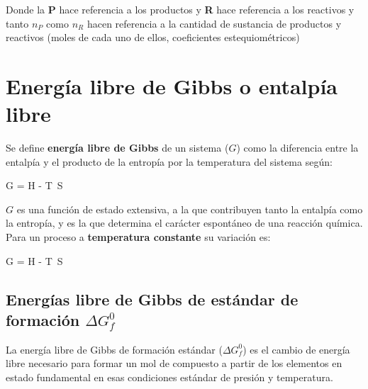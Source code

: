 Donde la \textbf{P} hace referencia a los productos y \textbf{R} hace referencia a los reactivos y tanto \(n_P\) como \(n_R\) hacen referencia a la cantidad de sustancia de productos y reactivos (moles de cada uno de ellos, coeficientes estequiométricos)




\section{Energía libre de Gibbs o entalpía libre}\label{sec:energia-libre-de-gibbs-o-entalpia-libre}


\begin{definition}
    Se define \textbf{energía libre de Gibbs} de un sistema (\(G\)) como la diferencia entre la entalpía y el producto de la entropía por la temperatura del sistema según:
    \begin{centeredequation}
        G = H - T\ S\label{eq:energia-libre-de-gibbs}
    \end{centeredequation}
\end{definition}




\(G\) es una función de estado extensiva, a la que contribuyen tanto la entalpía como la entropía, y es la que determina el carácter espontáneo de una reacción química.
Para un proceso a \textbf{temperatura constante} su variación es:
\begin{centeredequation}
    \Delta G = \Delta H - T\ \Delta S\label{eq:energia-libre}
\end{centeredequation}

\subsection{Energías libre de Gibbs de estándar de formación \texorpdfstring{\(\Delta G^0_f\)}{G}}\label{subsec:energias-libre-de-gibbs-de-estandar-de-formacion-texorpdfstring}

\begin{center}
    \begin{definition}
        La energía libre de Gibbs de formación estándar  (\(\Delta G^0_f\)) es el cambio de energía libre necesario para formar un mol de compuesto a partir de los elementos en estado fundamental en esas condiciones estándar de presión y temperatura.
    \end{definition}
\end{center}



